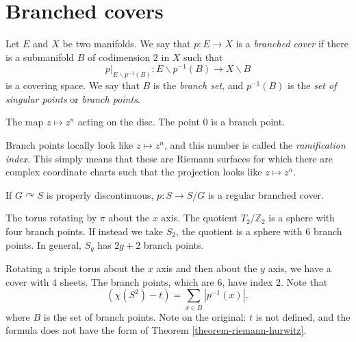 \section{Branched covers}
\label{section-branched-covers}

\begin{definition}
\label{definition-branched-cover}
Let $E$ and $X$ be two manifolds. We say
that $p:E\to X$ is a {\it branched
cover} if there is a submanifold $B$ of
codimension $2$ in $X$ such that
$$
p|_{E\backslash p^{-1}(B)}:
E\backslash p^{-1}(B)\to X\backslash B
$$
is a covering space. We say that $B$ is
the {\it branch set}, and $p^{-1}(B)$ is
the {\it set of singular points} or
{\it branch points}.
\end{definition}

\begin{example}
\label{example-power-map}
The map $z\mapsto z^n$ acting on the
disc. The point $0$ is a branch point.
\end{example}

\begin{remark}
\label{remark-ramification-index}
Branch points locally look like
$z\mapsto z^n$, and this number is
called the {\it ramification index}.
This simply means that these are Riemann
surfaces for which there are complex
coordinate charts such that the
projection looks like $z\mapsto z^n$.
\end{remark}

\begin{theorem}
\label{theorem-properly-discontinuous}
If $G\curvearrowright S$ is properly
discontinuous, $p:S\to S/G$ is a regular
branched cover.
\end{theorem}

\begin{example}
\label{example-hyperelliptic}
The torus rotating by $\pi$ about the
$x$ axis. The quotient
$T_2/\mathbb{Z}_2$ is a sphere with four
branch points. If instead we take $S_2$,
the quotient is a sphere with $6$ branch
points. In general, $S_g$ has $2g+2$
branch points.
\end{example}

\begin{example}
\label{example-triple-torus}
Rotating a triple torus about the $x$
axis and then about the $y$ axis, we
have a cover with $4$ sheets. The branch
points, which are $6$, have index $2$.
Note that
$$
(\chi(S^2)-t)=
\sum_{x\in B}|p^{-1}(x)|,
$$
where $B$ is the set of branch points.
Note on the original: $t$ is not
defined, and the formula does not have
the form of
Theorem \ref{theorem-riemann-hurwitz}.
\end{example}

